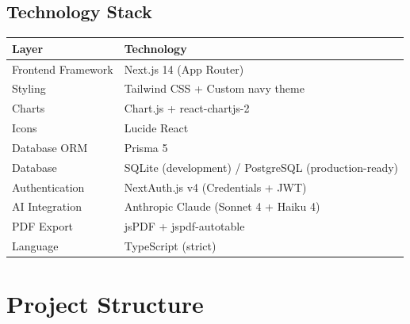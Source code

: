 \documentclass[12pt,a4paper]{article}
\begin{document}
\subsection*{Technology Stack}
\begin{center}
\begin{tabular}{ll}
\toprule
\textbf{Layer} & \textbf{Technology} \\
\midrule
Frontend Framework & Next.js 14 (App Router) \\
Styling & Tailwind CSS + Custom navy theme \\
Charts & Chart.js + react-chartjs-2 \\
Icons & Lucide React \\
Database ORM & Prisma 5 \\
Database & SQLite (development) / PostgreSQL (production-ready) \\
Authentication & NextAuth.js v4 (Credentials + JWT) \\
AI Integration & Anthropic Claude (Sonnet 4 + Haiku 4) \\
PDF Export & jsPDF + jspdf-autotable \\
Language & TypeScript (strict) \\
\bottomrule
\end{tabular}
\end{center}

\newpage

\section{Project Structure}
\end{document}
